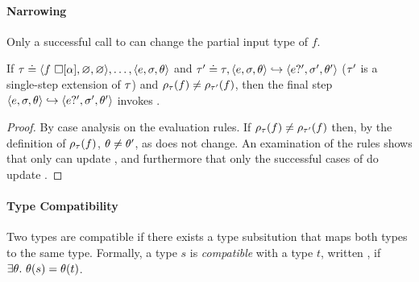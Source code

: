 
\paragraph{Narrowing}
%
Only a successful call to \forcesym can change the partial
input type of $f$.
%
\begin{lem}
\label{lem:force-inst}
If
$\tau \doteq \langle f\ \square[\alpha], \varnothing, \varnothing \rangle,\ldots,\langle e, \sigma, \theta \rangle$
and
$\tau' \doteq \tau, \langle e, \sigma, \theta \rangle \hookrightarrow \langle e?', \sigma', \theta' \rangle$
(\ie $\tau'$ is a single-step extension of $\tau$)
and
$\rho_{\tau}(f) \neq \rho_{\tau'}(f)$,
then the final step $\langle e, \sigma, \theta \rangle \hookrightarrow \langle e?', \sigma', \theta' \rangle$ invokes \forcesym.
\end{lem}

\begin{proof}
  By case analysis on the evaluation rules.
  If $\rho_{\tau}(f) \neq \rho_{\tau'}(f)$ then,
  by the definition of $\rho_{\tau}(f)$, $\theta \neq \theta'$, as \thole
  does not change.
  An examination of the rules shows that only \forcesym can update \tsu,
  and furthermore that only the successful cases of \forcesym do update
  \tsu.
\end{proof}


\paragraph{Type Compatibility}
Two types are compatible if there exists a type subsitution that maps both
types to the same type.
%
Formally, a type $s$ is
\emph{compatible} with a type $t$, written , if
$\exists \theta.\ \theta(s) = \theta(t)$.

